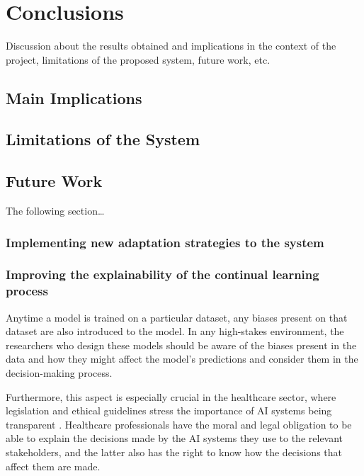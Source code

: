 \documentclass[../main.tex]{subfiles}
\begin{document}
\chapter{Conclusions} \label{chap:conclusions} 
    

    Discussion about the results obtained and implications in the context of the project, limitations of the proposed system, future work, etc.
    

    \section{Main Implications} \label{conclusions:implications} 

    \section{Limitations of the System} \label{conclusions:limitations} 
    
    \section{Future Work} \label{conclusions:future_work} 

    The following section\dots

    \subsection{
        Implementing new adaptation strategies to the system 
    } \label{conclusions:future_work:adaptation_strategies}

    \subsection{
        Improving the explainability of the continual learning process 
    } \label{conclusions:future_work:explainability}

    Anytime a model is trained on a particular dataset, any biases present on that dataset are also introduced to the model. In any high-stakes environment, the researchers who design these models should be aware of the biases present in the data and how they might affect the model's predictions and consider them in the decision-making process.

    Furthermore, this aspect is especially crucial in the healthcare sector, where legislation and ethical guidelines stress the importance of AI systems being transparent \cite{noauthor_ethics_2019,eu_aiact_2023}. Healthcare professionals have the moral and legal obligation to be able to explain the decisions made by the AI systems they use to the relevant stakeholders, and the latter also has the right to know how the decisions that affect them are made.
    
\end{document}
